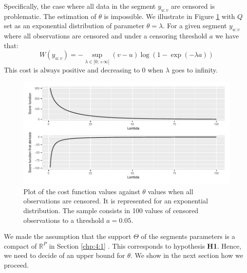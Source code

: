 Specifically, the case where all data in the segment $y_{u:v}$ are censored is problematic. The estimation of $\theta$ is impossible. We illustrate in Figure \ref{fig:onlycens} with $Q$ set as an exponential distribution of parameter $\theta = \lambda$. 
For a given segment $y_{u:v}$ where all observations are censored and under a censoring threshold $a$ we have that: 
\begin{equation} \label{chp:4:costex}
W(y_{u:v}) = -\sup_{\lambda \in ]0;+\infty[}(v-u)\log(1-\exp(-\lambda a)) 
\end{equation}
This cost is always positive and decreasing to 0 when $\lambda$ goes to infinity. 
\begin{figure}[ht]
    \centering
    \includegraphics{figs/Chap4/only_cens.pdf}
    \caption{Plot of the cost function values against $\theta$ values when all observations are censored. It is represented for an exponential distribution. The sample consists in 100 values of censored observations to a threshold $a = 0.05$.}
    \label{fig:onlycens}
\end{figure}

We made the assumption that the support $\Theta$ of the segments parameters is a compact of $\mathbb{R}^P$ in Section \ref{chp:4:1} . This corresponds to hypothesis \textbf{H1}. Hence, we need to decide of an upper bound for $\theta$. We show in the next section how we proceed. 


